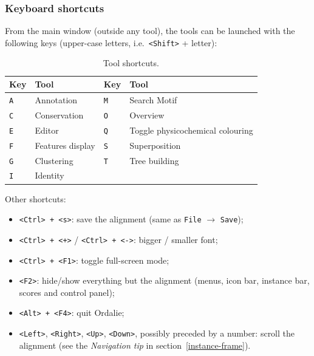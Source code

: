\documentclass[a4paper]{article}
\begin{document}
\subsubsection{Keyboard shortcuts}
\label{shortcuts}
From the main window (outside any tool), the tools can be launched with the following keys (upper-case letters, i.e.\ \texttt{<Shift>} + letter):
\begin{table}[h!]
\centering
\begin{tabular}{|l|l||l|l|}
\hline
\textbf{Key} & \textbf{Tool} & \textbf{Key} & \textbf{Tool}\\
\hline
\texttt{A} & Annotation        & \texttt{M} & Search Motif\\
\texttt{C} & Conservation      & \texttt{O} & Overview\\
\texttt{E} & Editor            & \texttt{Q} & Toggle physicochemical colouring\\
\texttt{F} & Features display  & \texttt{S} & Superposition\\
\texttt{G} & Clustering        & \texttt{T} & Tree building\\
\texttt{I} & Identity          &            & \\
\hline
\end{tabular}
\caption{Tool shortcuts.}
\end{table}

Other shortcuts:
\begin{itemize}
  \item \texttt{<Ctrl> + <s>}: save the alignment (same as \texttt{File} $\rightarrow$ \texttt{Save});
  \item \texttt{<Ctrl> + <+>} / \texttt{<Ctrl> + <->}: bigger / smaller font;
  \item \texttt{<Ctrl> + <F1>}: toggle full-screen mode;
  \item \texttt{<F2>}: hide/show everything but the alignment (menus, icon bar, instance bar, scores and control panel);
  \item \texttt{<Alt> + <F4>}: quit Ordalie;
  \item \texttt{<Left>}, \texttt{<Right>}, \texttt{<Up>}, \texttt{<Down>}, possibly preceded by a number: scroll the alignment (see the \textit{Navigation tip} in section~\ref{instance-frame}).
\end{itemize}
\end{document}
